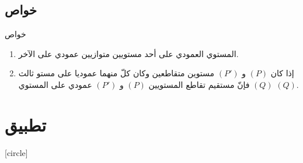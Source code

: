 \documentclass[dvipsnames,mathserif]{beamer}
\makeatletter
\newcommand{\leftm}{\@totalleftmargin}
\makeatother
\begin{document}
\subsection{خواص}
\begin{frame}{خواص}
\begin{exampleblock}{}
\begin{enumerate}\rightskip\leftm

\item 
المستوي العمودي على أحد مستويين متوازيين عمودي على الآخر.

\item
	إذا كان $(P)$ و $(P')$ مستوين متقاطعين وكان كلّ
            منهما عموديا على مستو ثالث $(Q)$ فإنّ مستقيم 
            تقاطع المستويين $(P)$ و $(P')$ عمودي على المستوي $(Q)$.


\end{enumerate}
\end{exampleblock}
\end{frame}

\section{تطبيق}

[circle]
\end{document}
